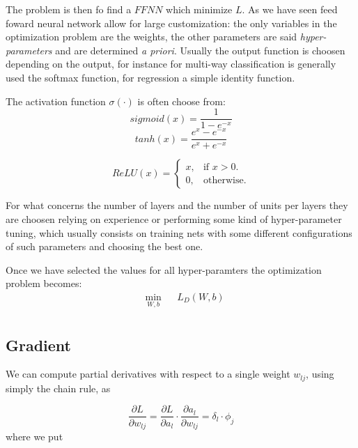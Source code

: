 The problem is then fo find a $FFNN$ which minimize $L$. As we have seen feed foward neural network allow for large customization: the only variables in the optimization problem are the weights, the other
parameters are said \textit{hyper-parameters} and are determined \textit{a priori}. Usually the output function is choosen depending on the output, for instance for multi-way classification
is generally used the softmax function, for regression a simple identity function.

The activation function $\sigma(\cdot)$ is often choose from:
\begin{equation}
 sigmoid(x)=\frac{1}{1-e^{-x}}
\end{equation}
\begin{equation}
 tanh(x)=\frac{e^x-e^{-x}}{e^x+e^{-x}}
\end{equation}

\begin{equation}
  ReLU(x)=\begin{cases}
    x, & \text{if $x>0$}.\\
    0, & \text{otherwise}.
  \end{cases}
\end{equation}

For what concerns the number of layers and the number of units per layers they are choosen relying on experience or performing some kind of hyper-parameter tuning, which usually consists on training nets
with some different configurations of such parameters and choosing the best one.

Once we have selected the values for all hyper-paramters the optimization problem becomes:
\begin{equation}
\begin{aligned}
& \underset{W,b}{\text{min}}
& & L_D(W,b) \\
\end{aligned}
\end{equation}






\subsection{Gradient}

We can compute partial derivatives with respect to a single weight $w_{lj}$, using simply the chain rule, as 

$$\frac{\partial L}{\partial w_{lj}}=\frac{\partial L}{\partial a_l} \cdot \frac{\partial a_l}{\partial w_{lj}}=\delta_l \cdot \phi_j$$
where we put

